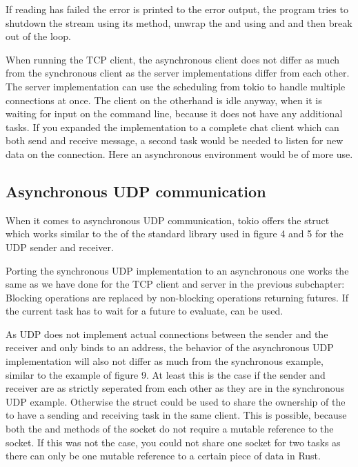 If reading has failed the error is printed to the error output, the program tries to shutdown the stream using its
 method, unwrap the  and  using  and  and then break out
of the loop.

When running the TCP client, the asynchronous client does not differ as much from the synchronous client as the server
implementations differ from each other. The server implementation can use the scheduling from tokio to handle multiple
connections at once. The client on the otherhand is idle anyway, when it is waiting for input on the command line,
because it does not have any additional tasks. If you expanded the implementation to a complete chat client which can
both send and receive message, a second task would be needed to listen for new data on the connection. Here an
asynchronous environment would be of more use.

\subsection{Asynchronous UDP communication}
When it comes to asynchronous UDP communication, tokio offers the struct  which works
similar to the  of the standard library used in figure 4 and 5 for the UDP sender and receiver.

Porting the synchronous UDP implementation to an asynchronous one works the same as we have done for the TCP client and
server in the previous subchapter: Blocking operations are replaced by non-blocking operations returning futures. If
the current task has to wait for a future to evaluate,  can be used.

As UDP does not implement actual connections between the sender and the receiver and only binds to an address, the
behavior of the asynchronous UDP implementation will also not differ as much from the synchronous example, similar to
the example of figure 9. At least this is the case if the sender and receiver are as strictly seperated from each other
as they are in the synchronous UDP example. Otherwise the struct  could be used to share the
ownership of the  to have a sending and receiving task in the same client. This is possible, because
both the  and  methods of the socket do not require a mutable reference to the socket. If
this was not the case, you could not share one socket for two tasks as there can only be one mutable reference to a
certain piece of data in Rust.
